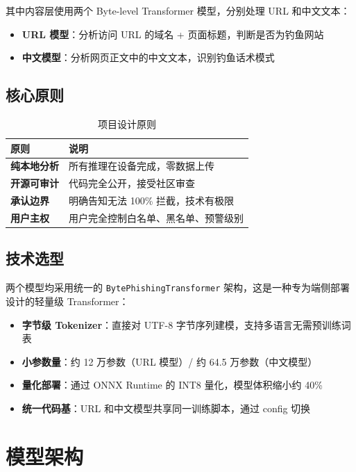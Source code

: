 \documentclass[11pt,a4paper]{article}
\begin{document}
其中内容层使用两个 Byte-level Transformer 模型，分别处理 URL 和中文文本：
\begin{itemize}
  \item \textbf{URL 模型}：分析访问 URL 的域名 + 页面标题，判断是否为钓鱼网站
  \item \textbf{中文模型}：分析网页正文中的中文文本，识别钓鱼话术模式
\end{itemize}

\subsection{核心原则}

\begin{table}[h]
\centering
\caption{项目设计原则}
\begin{tabular}{ll}
\toprule
原则 & 说明 \\
\midrule
\textbf{纯本地分析} & 所有推理在设备完成，零数据上传 \\
\textbf{开源可审计} & 代码完全公开，接受社区审查 \\
\textbf{承认边界} & 明确告知无法 100\% 拦截，技术有极限 \\
\textbf{用户主权} & 用户完全控制白名单、黑名单、预警级别 \\
\bottomrule
\end{tabular}
\end{table}

\subsection{技术选型}

两个模型均采用统一的 \texttt{BytePhishingTransformer} 架构，这是一种专为端侧部署设计的轻量级 Transformer：
\begin{itemize}
  \item \textbf{字节级 Tokenizer}：直接对 UTF-8 字节序列建模，支持多语言无需预训练词表
  \item \textbf{小参数量}：约 12 万参数（URL 模型）/ 约 64.5 万参数（中文模型）
  \item \textbf{量化部署}：通过 ONNX Runtime 的 INT8 量化，模型体积缩小约 40\%
  \item \textbf{统一代码基}：URL 和中文模型共享同一训练脚本，通过 config 切换
\end{itemize}

\section{模型架构}
\end{document}
